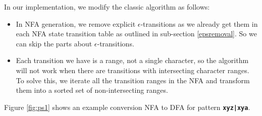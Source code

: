 In our implementation, we modify the classic algorithm as follows:
 \begin{itemize}
     \item In NFA generation, we remove explicit $\epsilon$-transitions as we already get them in each NFA state transition table as outlined in sub-section \ref{epsremoval}. So we can skip the parts about $\epsilon$-transitions.
     \item Each transition we have is a range, not a single character, so the algorithm will not work when there are transitions with intersecting character ranges. To solve this, we iterate all the transition ranges in the NFA and transform them into a sorted set of non-intersecting ranges.
 \end{itemize}
 
Figure \ref{fig:ps1} shows an example conversion NFA to DFA for pattern \texttt{\textbf{xyz|xya}}.


